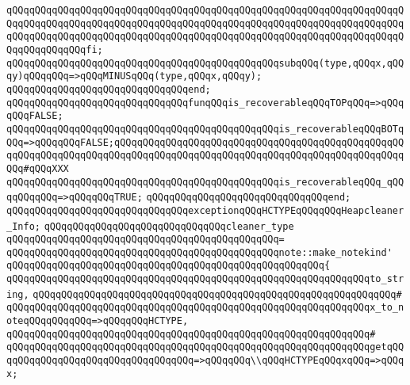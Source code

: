 \verb|qQQqqQQqqQQqqQQqqQQqqQQqqQQqqQQqqQQqqQQqqQQqqQQqqQQqqQQqqQQqqQQqqQQqqQQqqQQqqQQqqQQqqQQqqQQqqQQqqQQqqQQqqQQqqQQqqQQqqQQqqQQqqQQqqQQqqQQqqQQqqQQqqQQqqQQqqQQqqQQqqQQqqQQqqQQqqQQqqQQqqQQqqQQqqQQqqQQqqQQqqQQqqQQqqQQqqQQqqQQqqQQqfi;|\newline
\verb|qQQqqQQqqQQqqQQqqQQqqQQqqQQqqQQqqQQqqQQqqQQqqQQqsubqQQq(type,qQQqx,qQQqy)qQQqqQQq=>qQQqMINUSqQQq(type,qQQqx,qQQqy);|\newline
\verb|qQQqqQQqqQQqqQQqqQQqqQQqqQQqqQQqend;|\newline
\newline
\verb|qQQqqQQqqQQqqQQqqQQqqQQqqQQqqQQqfunqQQqis_recoverableqQQqTOPqQQq=>qQQqqQQqFALSE;|\newline
\verb|qQQqqQQqqQQqqQQqqQQqqQQqqQQqqQQqqQQqqQQqqQQqqQQqis_recoverableqQQqBOTqQQq=>qQQqqQQqFALSE;qQQqqQQqqQQqqQQqqQQqqQQqqQQqqQQqqQQqqQQqqQQqqQQqqQQqqQQqqQQqqQQqqQQqqQQqqQQqqQQqqQQqqQQqqQQqqQQqqQQqqQQqqQQqqQQqqQQqqQQqqQQq#qQQqXXX|\newline
\verb|qQQqqQQqqQQqqQQqqQQqqQQqqQQqqQQqqQQqqQQqqQQqqQQqis_recoverableqQQq_qQQqqQQqqQQq=>qQQqqQQqTRUE;|\newline
\verb|qQQqqQQqqQQqqQQqqQQqqQQqqQQqqQQqend;|\newline
\newline
\verb|qQQqqQQqqQQqqQQqqQQqqQQqqQQqqQQqexceptionqQQqHCTYPEqQQqqQQqHeapcleaner_Info;|\newline
\newline
\verb|qQQqqQQqqQQqqQQqqQQqqQQqqQQqqQQqcleaner_type|\newline
\verb|qQQqqQQqqQQqqQQqqQQqqQQqqQQqqQQqqQQqqQQqqQQqqQQq=|\newline
\verb|qQQqqQQqqQQqqQQqqQQqqQQqqQQqqQQqqQQqqQQqqQQqqQQqnote::make_notekind'|\newline
\verb|qQQqqQQqqQQqqQQqqQQqqQQqqQQqqQQqqQQqqQQqqQQqqQQqqQQqqQQq{|\newline
\verb|qQQqqQQqqQQqqQQqqQQqqQQqqQQqqQQqqQQqqQQqqQQqqQQqqQQqqQQqqQQqqQQqto_string,|\newline
\verb|qQQqqQQqqQQqqQQqqQQqqQQqqQQqqQQqqQQqqQQqqQQqqQQqqQQqqQQqqQQqqQQq#|\newline
\verb|qQQqqQQqqQQqqQQqqQQqqQQqqQQqqQQqqQQqqQQqqQQqqQQqqQQqqQQqqQQqqQQqx_to_noteqQQqqQQqqQQq=>qQQqqQQqHCTYPE,|\newline
\verb|qQQqqQQqqQQqqQQqqQQqqQQqqQQqqQQqqQQqqQQqqQQqqQQqqQQqqQQqqQQqqQQq#|\newline
\verb|qQQqqQQqqQQqqQQqqQQqqQQqqQQqqQQqqQQqqQQqqQQqqQQqqQQqqQQqqQQqqQQqgetqQQqqQQqqQQqqQQqqQQqqQQqqQQqqQQqqQQq=>qQQqqQQq\\qQQqHCTYPEqQQqxqQQq=>qQQqx;|\newline
